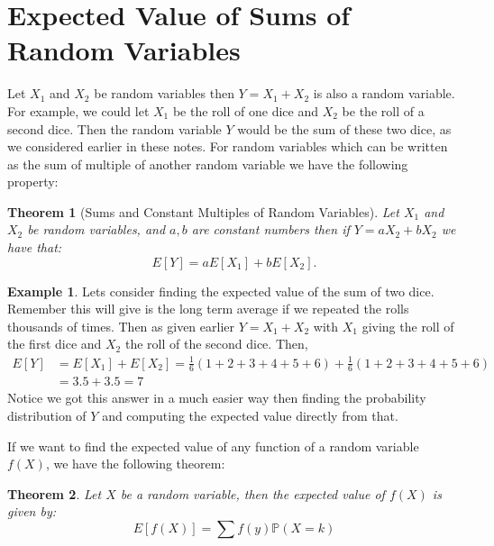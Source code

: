 \documentclass[
]{book}
\newcommand{\prob}[1]{{\mathbb{P}(#1)}}
\newtheorem{theorem}{Theorem}[chapter]
\theoremstyle{definition}
\theoremstyle{definition}
\newtheorem{example}{Example}[chapter]
\theoremstyle{definition}
\theoremstyle{definition}
\theoremstyle{remark}
\begin{document}
\hypertarget{expected-value-of-sums-of-random-variables}{%
\section{Expected Value of Sums of Random Variables}\label{expected-value-of-sums-of-random-variables}}

Let \(X_1\) and \(X_2\) be random variables then \(Y=X_1+X_2\) is also a random variable. For example, we could let \(X_1\) be the roll of one dice and \(X_2\) be the roll of a second dice. Then the random variable \(Y\) would be the sum of these two dice, as we considered earlier in these notes. For random variables which can be written as the sum of multiple of another random variable we have the following property:

\begin{theorem}[Sums and Constant Multiples of Random Variables]
\protect\hypertarget{thm:unnamed-chunk-265}{}\label{thm:unnamed-chunk-265}Let \(X_1\) and \(X_2\) be random variables, and \(a,b\) are constant numbers then if \(Y=aX_2+bX_2\) we have that: \[E[Y]=aE[X_1]+bE[X_2].\]
\end{theorem}

\begin{example}
\protect\hypertarget{exm:unnamed-chunk-266}{}\label{exm:unnamed-chunk-266}Lets consider finding the expected value of the sum of two dice. Remember this will give is the long term average if we repeated the rolls thousands of times. Then as given earlier \(Y=X_1+X_2\) with \(X_1\) giving the roll of the first dice and \(X_2\) the roll of the second dice. Then,
\[
\begin{aligned}
E[Y]&=E[X_1]+E[X_2]=\frac{1}{6}(1+2+3+4+5+6)+\frac{1}{6}(1+2+3+4+5+6)\\&=3.5+3.5=7
\end{aligned}
\]
Notice we got this answer in a much easier way then finding the probability distribution of \(Y\) and computing the expected value directly from that.
\end{example}

If we want to find the expected value of any function of a random variable \(f(X)\), we have the following theorem:

\begin{theorem}
\protect\hypertarget{thm:unnamed-chunk-267}{}\label{thm:unnamed-chunk-267}Let \(X\) be a random variable, then the expected value of \(f(X)\) is given by: \[E[f(X)]=\sum f(y) \prob{X=k}\]
\end{theorem}
\end{document}

